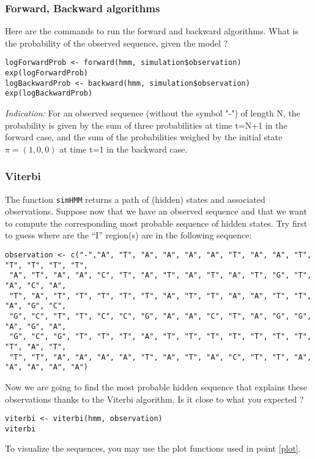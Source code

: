 \documentclass[a4paper,11pt]{article}
\begin{document}
\subsubsection{Forward, Backward algorithms}

Here are the commands to run the forward and backward algorithms. What is the probability of the observed sequence, given the model ? 

\begin{verbatim}
logForwardProb <- forward(hmm, simulation$observation)
exp(logForwardProb)
logBackwardProb <- backward(hmm, simulation$observation)
exp(logBackwardProb)
\end{verbatim}

\noindent \textit{Indication:} For an observed sequence (without the symbol "-") of length N, the probability is given by the sum of three probabilities at time t=N+1 in the forward case, and the sum of the probabilities weighed by the initial state $\pi = (1,0,0)$ at time t=1 in the backward case. 

\subsubsection{Viterbi}

The function \texttt{simHMM} returns a path of (hidden) states and associated observations. Suppose now that  we have an observed sequence and that we want to compute the corresponding most probable sequence of hidden states. Try first to guess where are the ``I'' region(s) are in the following sequence:

\begin{verbatim}
observation <- c("-","A", "T", "A", "A", "A", "A", "T", "A", "A", "T", "T", "T", "T", "T",
 "A", "T", "A", "A", "C", "T", "A", "T", "A", "T", "A", "T", "G", "T", "A", "C", "A", 
 "T", "A", "T", "T", "T", "T", "T", "A", "T", "T", "A", "A", "T", "T", "A", "G", "C", 
 "G", "C", "T", "T", "C", "C", "G", "A", "A", "C", "T", "A", "G", "G", "A", "G", "A", 
 "G", "C", "G", "T", "T", "T", "A", "T", "T", "T", "T", "T", "T", "T", "T", "A", "T", 
 "T", "T", "A", "A", "A", "A", "T", "A", "T", "A", "C", "T", "T", "A", "A", "A", "A", "A")
\end{verbatim}

Now we are going to find the most probable hidden sequence that explains these observations thanks to the Viterbi algorithm. Is it close to what you expected ? 

\begin{verbatim}
viterbi <- viterbi(hmm, observation)
viterbi
\end{verbatim}
To visualize the sequences, you may use the plot functions used in point \ref{plot}. 
\end{document}
